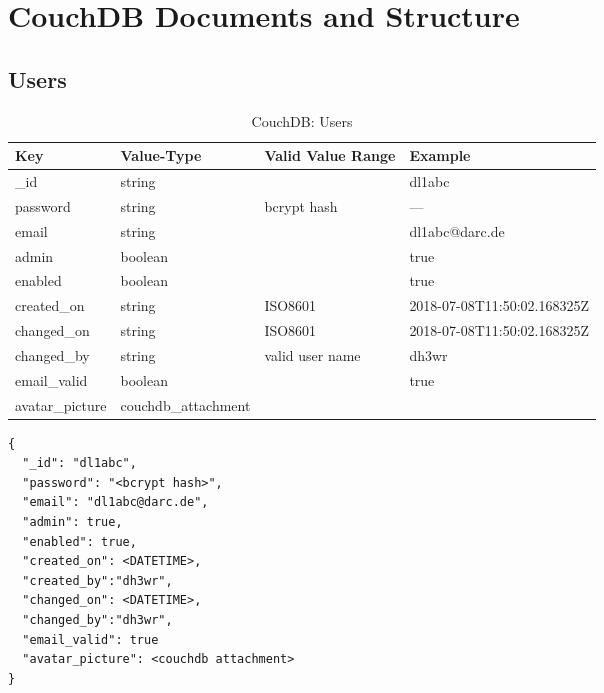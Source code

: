 \section{CouchDB Documents and Structure}

\subsection{Users}

\begin{table}[h]
 \centering
 \caption{CouchDB: Users}
 \begin{tabular}{|l|l|l|l|} \hline
  Key & Value-Type & Valid Value Range & Example \\
  \hline
  \_id & string & & dl1abc \\
  password & string & bcrypt hash & --- \\
  email & string & & dl1abc@darc.de \\
  admin & boolean & & true \\
  enabled & boolean & & true \\
  created\_on & string & ISO8601 & 2018-07-08T11:50:02.168325Z \\
  changed\_on & string & ISO8601 & 2018-07-08T11:50:02.168325Z \\
  changed\_by & string & valid user name & dh3wr \\
  email\_valid & boolean & & true \\
  avatar\_picture & couchdb\_attachment & & \\ \hline
  \end{tabular}
  \label{tab:couchdb:users}
\end{table}

\begin{lstlisting}
{
  "_id": "dl1abc",
  "password": "<bcrypt hash>",
  "email": "dl1abc@darc.de",
  "admin": true,
  "enabled": true,
  "created_on": <DATETIME>,
  "created_by":"dh3wr",
  "changed_on": <DATETIME>,
  "changed_by":"dh3wr",
  "email_valid": true
  "avatar_picture": <couchdb attachment>
}
\end{lstlisting}


